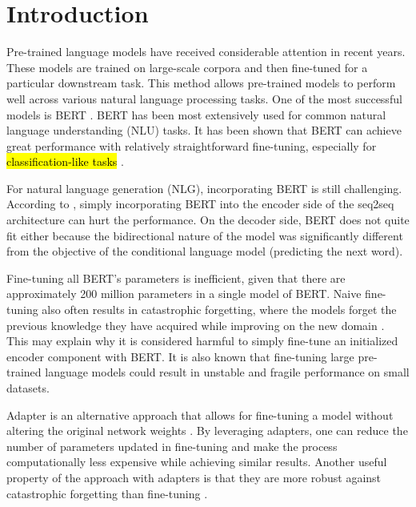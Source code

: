\chapter*{Introduction}
Pre-trained language models  have received considerable attention in recent years. These models are trained on large-scale corpora and then fine-tuned for a particular downstream task. This method allows pre-trained models to perform well across various natural language processing tasks. One of the most successful models is BERT . BERT has been most extensively used for common natural language understanding (NLU) tasks. It has been shown that BERT can achieve great performance with relatively straightforward fine-tuning, especially for \hl{classification-like tasks} .

For natural language generation (NLG), incorporating BERT is still challenging. According to , simply incorporating BERT into the encoder side of the seq2seq architecture can hurt the performance. On the decoder side, BERT does not quite fit either because the bidirectional nature of the model was significantly different from the objective of the conditional language model (predicting the next word).

Fine-tuning all BERT's parameters is inefficient, given that there are approximately 200 million parameters in a single model of BERT. Naive fine-tuning also often results in catastrophic forgetting, where the models forget the previous knowledge they have acquired while improving on the new domain . This may explain why it is considered harmful to simply fine-tune an initialized encoder component with BERT. It is also known that fine-tuning large pre-trained language models could result in unstable and fragile performance on small datasets.

Adapter is an alternative approach that allows for fine-tuning a model without altering the original network weights . By leveraging adapters, one can reduce the number of parameters updated in fine-tuning and make the process computationally less expensive while achieving similar results. Another useful property of the approach with adapters is that they are more robust against catastrophic forgetting than fine-tuning .

